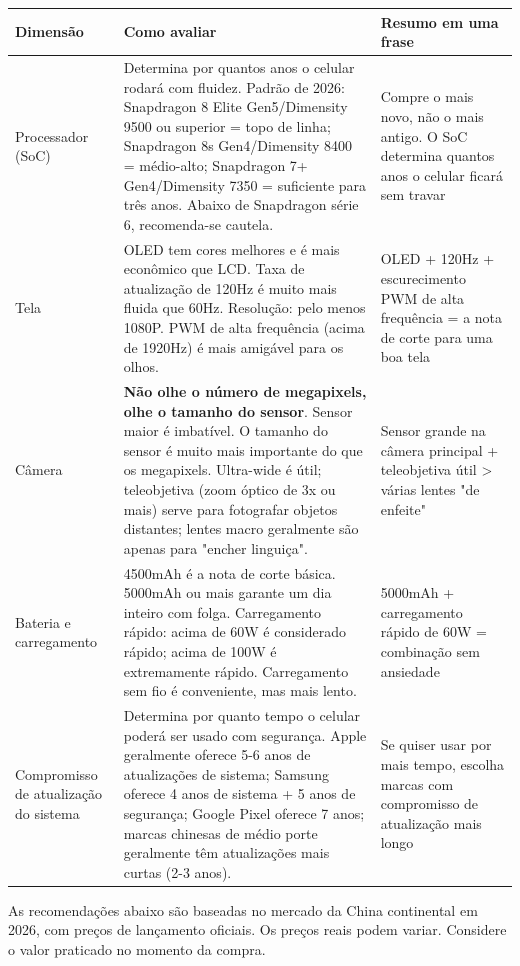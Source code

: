 \begin{center}
\begin{tabularx}{\linewidth}{|X|X|X|}
\hline
\textbf{Dimensão} & \textbf{Como avaliar} & \textbf{Resumo em uma frase} \tabularnewline
\hline
Processador (SoC) & Determina por quantos anos o celular rodará com fluidez. Padrão de 2026: Snapdragon 8 Elite Gen5/Dimensity 9500 ou superior = topo de linha; Snapdragon 8s Gen4/Dimensity 8400 = médio-alto; Snapdragon 7+ Gen4/Dimensity 7350 = suficiente para três anos. Abaixo de Snapdragon série 6, recomenda-se cautela. & Compre o mais novo, não o mais antigo. O SoC determina quantos anos o celular ficará sem travar \tabularnewline
Tela & OLED tem cores melhores e é mais econômico que LCD. Taxa de atualização de 120Hz é muito mais fluida que 60Hz. Resolução: pelo menos 1080P. PWM de alta frequência (acima de 1920Hz) é mais amigável para os olhos. & OLED + 120Hz + escurecimento PWM de alta frequência = a nota de corte para uma boa tela \tabularnewline
Câmera & \textbf{Não olhe o número de megapixels, olhe o tamanho do sensor}. Sensor maior é imbatível. O tamanho do sensor é muito mais importante do que os megapixels. Ultra-wide é útil; teleobjetiva (zoom óptico de 3x ou mais) serve para fotografar objetos distantes; lentes macro geralmente são apenas para "encher linguiça". & Sensor grande na câmera principal + teleobjetiva útil > várias lentes "de enfeite" \tabularnewline
Bateria e carregamento & 4500mAh é a nota de corte básica. 5000mAh ou mais garante um dia inteiro com folga. Carregamento rápido: acima de 60W é considerado rápido; acima de 100W é extremamente rápido. Carregamento sem fio é conveniente, mas mais lento. & 5000mAh + carregamento rápido de 60W = combinação sem ansiedade \tabularnewline
Compromisso de atualização do sistema & Determina por quanto tempo o celular poderá ser usado com segurança. Apple geralmente oferece 5-6 anos de atualizações de sistema; Samsung oferece 4 anos de sistema + 5 anos de segurança; Google Pixel oferece 7 anos; marcas chinesas de médio porte geralmente têm atualizações mais curtas (2-3 anos). & Se quiser usar por mais tempo, escolha marcas com compromisso de atualização mais longo \tabularnewline
\hline
\end{tabularx}
\end{center}


As recomendações abaixo são baseadas no mercado da China continental em 2026, com preços de lançamento oficiais. Os preços reais podem variar. Considere o valor praticado no momento da compra.

